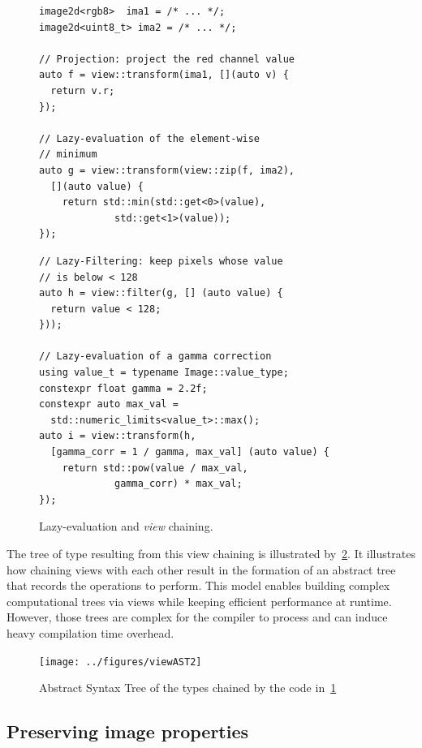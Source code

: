 \begin{figure}[htbp]
  \begin{minipage}[l]{0.48\linewidth}
    \begin{verbatim}
image2d<rgb8>  ima1 = /* ... */;
image2d<uint8_t> ima2 = /* ... */;

// Projection: project the red channel value
auto f = view::transform(ima1, [](auto v) {
  return v.r;
});

// Lazy-evaluation of the element-wise
// minimum
auto g = view::transform(view::zip(f, ima2),
  [](auto value) {
    return std::min(std::get<0>(value),
             std::get<1>(value));
});
\end{verbatim}
  \end{minipage}
  \hfill
  \begin{minipage}[l]{0.48\linewidth}
    \begin{verbatim}
// Lazy-Filtering: keep pixels whose value
// is below < 128
auto h = view::filter(g, [] (auto value) {
  return value < 128;
}));

// Lazy-evaluation of a gamma correction
using value_t = typename Image::value_type;
constexpr float gamma = 2.2f;
constexpr auto max_val =
  std::numeric_limits<value_t>::max();
auto i = view::transform(h,
  [gamma_corr = 1 / gamma, max_val] (auto value) {
    return std::pow(value / max_val,
             gamma_corr) * max_val;
});
\end{verbatim}
  \end{minipage}

  \caption{Lazy-evaluation and \emph{view} chaining.}
  \label{fig.lazy}
\end{figure}

The tree of type resulting from this view chaining is illustrated by~\cref{fig.viewAST}. It illustrates how chaining
views with each other result in the formation of an abstract tree that records the operations to perform. This model
enables building complex computational trees via views while keeping efficient performance at runtime. However, those
trees are complex for the compiler to process and can induce heavy compilation time overhead.

\begin{figure}[htb]
  \centering
  \texttt{[image: ../figures/viewAST2]}
  \caption{Abstract Syntax Tree of the types chained by the code in~\cref{fig.lazy}}
  \label{fig.viewAST}
\end{figure}


\subsection{Preserving image properties}

